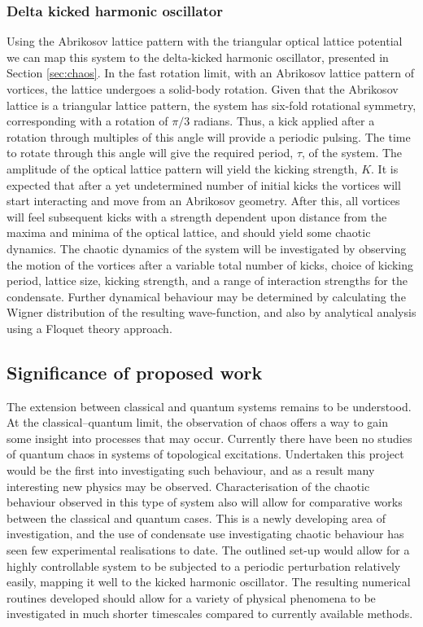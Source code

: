 \subsubsection{Delta kicked harmonic oscillator}
Using the Abrikosov lattice pattern with the triangular optical lattice potential we can map this system to the delta-kicked harmonic oscillator, presented in Section \ref{sec:chaos}. In the fast rotation limit, with an Abrikosov lattice pattern of vortices, the lattice undergoes a solid-body rotation. Given that the Abrikosov lattice is a triangular lattice pattern, the system has six-fold rotational symmetry, corresponding with a rotation of $\pi/3$ radians. Thus, a kick applied after a rotation through multiples of this angle will provide a periodic pulsing. The time to rotate through this angle will give the required period, $\tau$, of the system. The amplitude of the optical lattice pattern
will yield the kicking strength, $K$. It is expected that after a yet undetermined number of initial kicks the vortices will start interacting and move from an Abrikosov geometry. After this, all vortices will feel subsequent kicks with a strength dependent upon distance from the maxima and minima of the optical lattice, and should yield some chaotic dynamics. The chaotic dynamics of the system will be investigated by observing the motion of the vortices after a variable total number of kicks, choice of kicking period, lattice size, kicking strength, and a range of interaction strengths for the condensate. Further dynamical behaviour may be determined by calculating the Wigner distribution of the resulting wave-function, and also by analytical analysis using a Floquet theory approach.

\subsection{Significance of proposed work}
The extension between classical and quantum systems remains to be understood. At the classical--quantum limit, the observation of chaos offers a way to gain some insight into processes that may occur. Currently there have been no studies of quantum chaos in systems of topological excitations. Undertaken this project would be the first into investigating such behaviour, and as a result many interesting new physics may be observed. Characterisation of the chaotic behaviour observed in this type of system also will allow for comparative works between the classical and quantum cases. This is a newly developing area of investigation, and the use of condensate use investigating chaotic behaviour has seen few experimental realisations to date. The outlined set-up would allow for a highly controllable system to be subjected to a periodic perturbation relatively easily, mapping it well to the kicked harmonic oscillator. The resulting numerical routines developed should allow for a variety of physical phenomena to be investigated in much shorter timescales compared to currently available methods.

